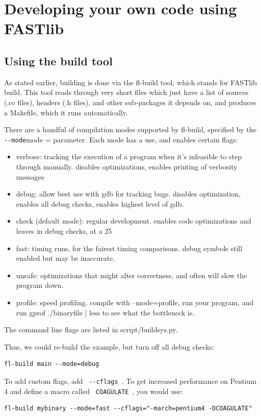 \documentclass[letter]{report}
\begin{document}
\section {Developing your own code using FASTlib}
 
\subsection {Using the build tool}

As stated earlier, building is done via the fl-build tool, which stands for FASTlib build. This tool reads through very short files which just have a list of sources (.cc files), headers (.h files), and other sub-packages it depends on, and produces a Makefile, which it runs automatically.

There are a handful of compilation modes supported by fl-build, specified by the \verb = --mode=mode = parameter. Each mode has a use, and enables certain flags:
\begin{itemize}
\item verbose: tracking the execution of a program when it's infeasible to step through manually. disables optimizations, enables printing of verbosity messages
\item debug: allow best use with gdb for tracking bugs. disables optimization, enables all debug checks, enables highest level of gdb.
\item check (default mode): regular development. enables code optimizations and leaves in debug checks, at a 25%
\item fast: timing runs, for the fairest timing comparisons. debug symbols still enabled but may be inaccurate.
\item unsafe: optimizations that might alter correctness, and often will slow the program down.
\item profile: speed profiling. compile with --mode=profile, run your program, and run gprof ./binaryfile | less to see what the bottleneck is. 
\end{itemize}
The command line flags are listed in script/buildsys.py. 

Thus, we could re-build the example, but turn off all debug checks:
\begin{verbatim}
fl-build main --mode=debug
\end{verbatim}
To add custom flags, add \verb= --cflags =. To get increased performance on Pentium 4 and define a macro called \verb= COAGULATE =, you would use:
\begin{verbatim}
fl-build mybinary --mode=fast --cflags="-march=pentium4 -DCOAGULATE"
\end{verbatim}
\end{document}
